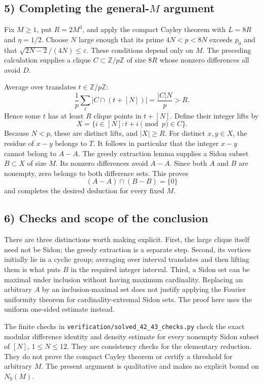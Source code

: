 \subsection{5) Completing the general-$M$ argument}
Fix $M\geq1$, put $R=2M^3$, and apply the compact Cayley theorem with
$L=8R$ and $\eta=1/2$. Choose $N$ large enough that its prime
$4N<p<8N$ exceeds $p_0$ and that
$\sqrt{2N-2}/(4N)\leq\varepsilon$.
These conditions depend only on $M$. The preceding calculation supplies
a clique $C\subset\mathbb Z/p\mathbb Z$ of size $8R$ whose nonzero
differences all avoid $D$.

Average over translates $t\in\mathbb Z/p\mathbb Z$:
\[
 \frac1p\sum_t |C\cap(t+[N])|=\frac{|C|N}{p}>R.
\]
Hence some $t$ has at least $R$ clique points in $t+[N]$.
Define their integer lifts by
\[
 X=\{i\in[N]:t+i\pmod p\in C\}.
\]
Because $N<p$, these are distinct lifts, and $|X|\geq R$.
For distinct $x,y\in X$, the residue of $x-y$ belongs to $T$.
It follows in particular that the integer $x-y$ cannot belong to $A-A$.
The greedy extraction lemma supplies a Sidon subset $B\subset X$ of
size $M$. Its nonzero differences avoid $A-A$. Since both $A$ and $B$
are nonempty, zero belongs to both difference sets. This proves
\[
 (A-A)\cap(B-B)=\{0\}
\]
and completes the desired deduction for every fixed $M$.

\subsection{6) Checks and scope of the conclusion}
There are three distinctions worth making explicit. First, the large
clique itself need not be Sidon; the greedy extraction is a separate
step. Second, its vertices initially lie in a cyclic group; averaging
over interval translates and then lifting them is what puts $B$ in the
required integer interval. Third, a Sidon set can be maximal under
inclusion without having maximum cardinality. Replacing an arbitrary
$A$ by an inclusion-maximal set does not justify applying the Fourier
uniformity theorem for cardinality-extremal Sidon sets. The proof here
uses the uniform one-sided estimate instead.

The finite checks in \texttt{verification/solved\_42\_43\_checks.py}
check the exact modular difference identity and density estimate for
every nonempty Sidon subset of $[N]$, $1\leq N\leq12$.
They are consistency checks for the elementary reduction. They do not
prove the compact Cayley theorem or certify a threshold for arbitrary
$M$. The present argument is qualitative and makes no explicit bound
on $N_0(M)$.

